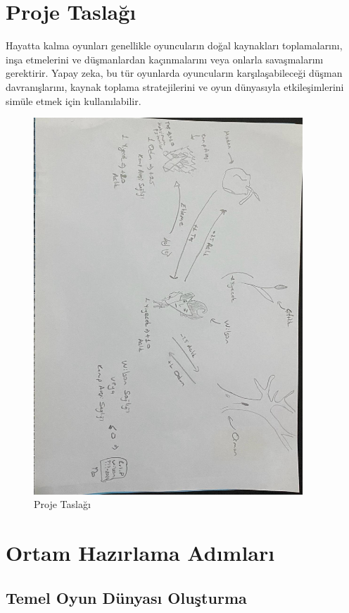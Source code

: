 \documentclass{article}
\begin{document}
 \section{Proje Taslağı}
 Hayatta kalma oyunları genellikle oyuncuların doğal kaynakları toplamalarını, inşa etmelerini ve düşmanlardan kaçınmalarını veya onlarla savaşmalarını gerektirir. Yapay zeka, bu tür oyunlarda oyuncuların karşılaşabileceği düşman davranışlarını, kaynak toplama stratejilerini ve oyun dünyasıyla etkileşimlerini simüle etmek için kullanılabilir.
\begin{figure}[h]
    \centering
    \includegraphics[angle=90,width=0.9\textwidth]{taslak.jpeg}
    \caption{Proje Taslağı}
    \label{fig:resim7}
\end{figure}
\clearpage
\section{Ortam Hazırlama Adımları}

\subsection{Temel Oyun Dünyası Oluşturma}
\end{document}
